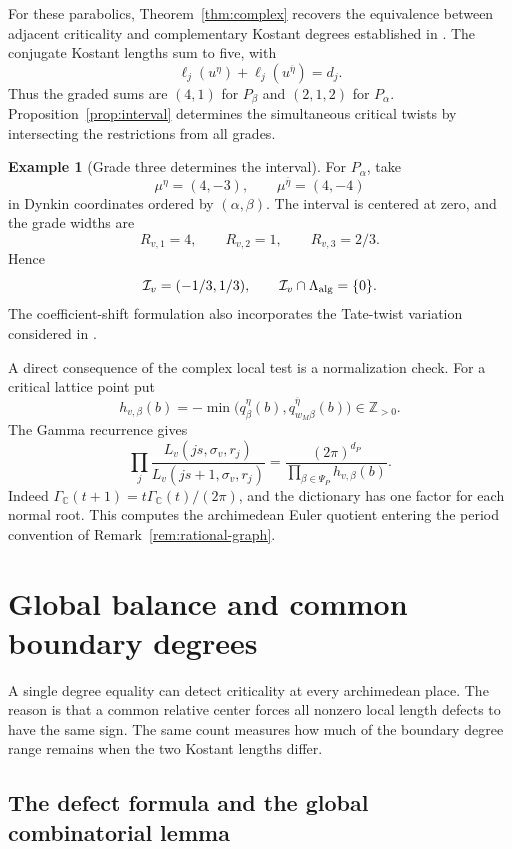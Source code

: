 \documentclass[12pt]{amsart}
\numberwithin{equation}{section}
\theoremstyle{plain}
\theoremstyle{definition}
\newtheorem{example}[theorem]{Example}
\theoremstyle{remark}
\renewcommand{\bar}{\overline}
\newcommand{\C}{\mathbb C}
\newcommand{\Z}{\mathbb{Z}}
\begin{document}
For these parabolics, Theorem~\ref{thm:complex} recovers the equivalence between adjacent criticality and complementary Kostant degrees established in \cite[Lemmas~6.1--6.2]{HosseiniJafariG2}. The conjugate Kostant lengths sum to five, with
\[
 \ell_j(u^\eta)+\ell_j(u^{\bar\eta})=d_j.
\]
Thus the graded sums are $(4,1)$ for $P_\beta$ and $(2,1,2)$ for $P_\alpha$. Proposition~\ref{prop:interval} determines the simultaneous critical twists by intersecting the restrictions from all grades. 

\begin{example}[Grade three determines the interval]\label{ex:g2-trivial}
For $P_\alpha$, take 
\[
 \mu^\eta=(4,-3),\qquad
 \mu^{\bar\eta}=(4,-4)
\]
in Dynkin coordinates ordered by $(\alpha,\beta)$. The interval is centered at zero, and the grade widths are
\[
 R_{v,1}=4,\qquad R_{v,2}=1,\qquad R_{v,3}=2/3.
\]
Hence
\[
 \mathcal I_v=(-1/3,1/3),
 \qquad
 \mathcal I_v\cap\Lambda_{\rm alg}=\{0\}.
\]
The coefficient-shift formulation also incorporates the Tate-twist variation considered in \cite[\S6.3]{HosseiniJafariG2}.
\end{example}

A direct consequence of the complex local test is a normalization check. For a critical lattice point put 
\[
 h_{v,\beta}(b)=-\min\bigl(q^\eta_\beta(b),
                         q^{\bar\eta}_{w_M\beta}(b)\bigr)
                \in\Z_{>0}.
\]
The Gamma recurrence gives
\begin{equation}\label{eq:Gamma-quotient}
 \prod_j\frac{L_v(js,\sigma_v,r_j)}{L_v(js+1,\sigma_v,r_j)}
     =\frac{(2\pi)^{d_P}}
             {\displaystyle\prod_{\beta\in\Psi_P}h_{v,\beta}(b)}.
\end{equation}
Indeed $\Gamma_\C(t+1)=t\Gamma_\C(t)/(2\pi)$, and the dictionary has one factor for each normal root. This computes the archimedean Euler quotient entering the period convention of Remark~\ref{rem:rational-graph}.

\section{Global balance and common boundary degrees}\label{sec:cohomological-degrees}
A single degree equality can detect criticality at every archimedean place. The reason is that a common relative center forces all nonzero local length defects to have the same sign. The same count measures how much of the boundary degree range remains when the two Kostant lengths differ.

\subsection{The defect formula and the global combinatorial lemma}
\end{document}
